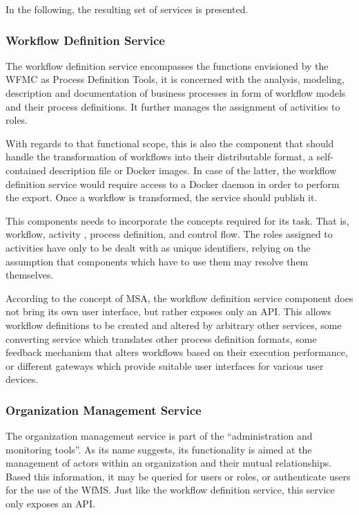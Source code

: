   In the following, the resulting set of services is presented.

    \subsubsection{Workflow Definition Service} %
      \label{subs:workflow_definition_service}

      The workflow definition service encompasses the functions envisioned by the \ac{WFMC} as Process Definition Tools, \ie it is concerned with the analysis, modeling, description and documentation of business processes in form of workflow models and their process definitions. It further manages the assignment of activities to roles.

      With regards to that functional scope, this is also the component that should handle the transformation of workflows into their distributable format, \eg a self-contained description file or Docker images. In case of the latter, the workflow definition service would require access to a Docker daemon in order to perform the export. Once a workflow is transformed, the service should publish it.

      This components needs to incorporate the concepts required for its task. That is, workflow, activity , process definition, and control flow. The roles assigned to activities have only to be dealt with as unique identifiers, relying on the assumption that components which have to use them may resolve them themselves.

      According to the concept of \ac{MSA}, the workflow definition service component does not bring its own user interface, but rather exposes only an \ac{API}. This allows workflow definitions to be created and altered by arbitrary other services, \eg some converting service which translates other process definition formats, some feedback mechanism that alters workflows based on their execution performance, or different gateways which provide suitable user interfaces for various user devices.

    \subsubsection{Organization Management Service} %
      \label{subs:organization_management_service}
      The organization management service is part of the ``administration and monitoring tools''.
      As its name suggests, its functionality is aimed at the management of actors within an organization and their mutual relationships. Based this information, it may be queried for users or roles, or authenticate users for the use of the \ac{WfMS}. Just like the workflow definition service, this service only exposes an \ac{API}.

